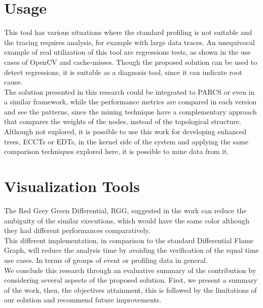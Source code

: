 \section{Usage}
This tool has various situations where the standard profiling is not suitable and the tracing requires analysis, for example with large data traces.
An unequivocal example of real utilization of this tool are regressions tests, as shown in the use cases of OpenCV and cache-misses. Though the proposed solution can be used to detect regressions, it is suitable as a diagnosis tool, since it can indicate root cause.\\
The solution presented in this research could be integrated to PARCS or even in a similar framework, while the performance metrics are compared in each version and see the patterns, since the mining technique have a complementary approach that compares the weights of the nodes, instead of the topological structure. \\
Although not explored, it is possible to use this work for developing enhanced trees, ECCTs or EDTs, in the kernel side of the system and applying the same comparison techniques explored here, it is possible to mine data from it.
\section{Visualization Tools}
The Red Grey Green Differential, RGG, suggested in the work can reduce the ambiguity of the similar executions, which would have the same color although they had different performances comparatively. \\
This different implementation, in comparison to the standard Differential Flame Graph, will reduce the analysis time by avoiding the verification of the equal time use cases. In terms of groups of event or profiling data in general.\\
We conclude this research through an evaluative summary of the contribution by considering several aspects of the proposed solution. First, we present a summary of the work, then, the objectives attainment, this is followed by the limitations of our solution and recommend future improvements.

